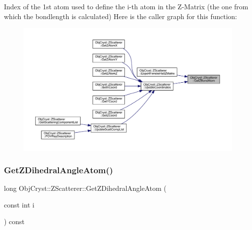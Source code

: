 Index of the 1st atom used to define the i-\/th atom in the Z-\/\+Matrix (the one from which the bondlength is calculated) Here is the caller graph for this function\+:
\nopagebreak
\begin{figure}[H]
\begin{center}
\leavevmode
\includegraphics[width=350pt]{class_obj_cryst_1_1_z_scatterer_a43c9a89c1b3523e0f321bb587342a9af_icgraph}
\end{center}
\end{figure}
\mbox{\label{class_obj_cryst_1_1_z_scatterer_a8ab9425588c99c32c4c8c68ebe641723}} 
\subsubsection{\texorpdfstring{GetZDihedralAngleAtom()}{GetZDihedralAngleAtom()}}
{\footnotesize\ttfamily long Obj\+Cryst\+::\+Z\+Scatterer\+::\+Get\+Z\+Dihedral\+Angle\+Atom (\begin{DoxyParamCaption}\item[{const int}]{i }\end{DoxyParamCaption}) const}

